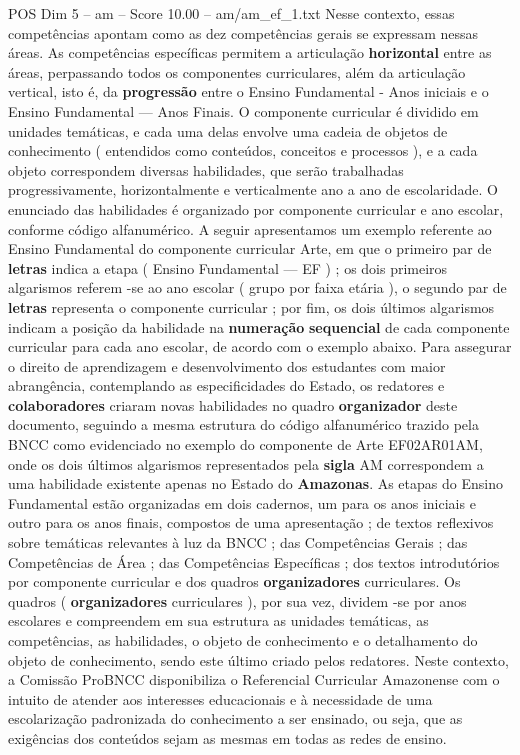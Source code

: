 \begin{textsample}{POS Dim 5 – am – Score 10.00 – am/am\_ef\_1.txt}
Nesse contexto, essas competências apontam como as dez competências gerais se expressam nessas áreas.
As competências específicas permitem a articulação \textbf{horizontal} entre as áreas, perpassando todos os componentes curriculares, além da articulação vertical, isto é, da \textbf{progressão} entre o Ensino Fundamental - Anos iniciais e o Ensino Fundamental — Anos Finais.
O componente curricular é dividido em unidades temáticas, e cada uma delas envolve uma cadeia de objetos de conhecimento ( entendidos como conteúdos, conceitos e processos ), e a cada objeto correspondem diversas habilidades, que serão trabalhadas progressivamente, horizontalmente e verticalmente ano a ano de escolaridade.
O enunciado das habilidades é organizado por componente curricular e ano escolar, conforme código alfanumérico.
A seguir apresentamos um exemplo referente ao Ensino Fundamental do componente curricular Arte, em que o primeiro par de \textbf{letras} indica a etapa ( Ensino Fundamental — EF ) ; os dois primeiros algarismos referem -se ao ano escolar ( grupo por faixa etária ), o segundo par de \textbf{letras} representa o componente curricular ; por fim, os dois últimos algarismos indicam a posição da habilidade na \textbf{numeração} \textbf{sequencial} de cada componente curricular para cada ano escolar, de acordo com o exemplo abaixo.
Para assegurar o direito de aprendizagem e desenvolvimento dos estudantes com maior abrangência, contemplando as especificidades do Estado, os redatores e \textbf{colaboradores} criaram novas habilidades no quadro \textbf{organizador} deste documento, seguindo a mesma estrutura do código alfanumérico trazido pela BNCC como evidenciado no exemplo do componente de Arte EF02AR01AM, onde os dois últimos algarismos representados pela \textbf{sigla} AM correspondem a uma habilidade existente apenas no Estado do \textbf{Amazonas}.
As etapas do Ensino Fundamental estão organizadas em dois cadernos, um para os anos iniciais e outro para os anos finais, compostos de uma apresentação ; de textos reflexivos sobre temáticas relevantes à luz da BNCC ; das Competências Gerais ; das Competências de Área ; das Competências Específicas ; dos textos introdutórios por componente curricular e dos quadros \textbf{organizadores} curriculares.
Os quadros ( \textbf{organizadores} curriculares ), por sua vez, dividem -se por anos escolares e compreendem em sua estrutura as unidades temáticas, as competências, as habilidades, o objeto de conhecimento e o detalhamento do objeto de conhecimento, sendo este último criado pelos redatores.
Neste contexto, a Comissão ProBNCC disponibiliza o Referencial Curricular Amazonense com o intuito de atender aos interesses educacionais e à necessidade de uma escolarização padronizada do conhecimento a ser ensinado, ou seja, que as exigências dos conteúdos sejam as mesmas em todas as redes de ensino.

\end{textsample}
